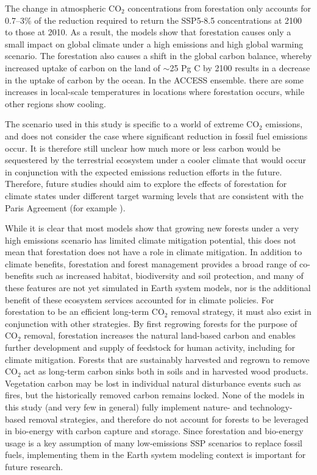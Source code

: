 \documentclass[]{article}
\begin{document}
The change in atmospheric CO$_2$ concentrations from forestation only accounts for 0.7--3\% of the reduction required to return the SSP5-8.5 concentrations at 2100 to those at 2010.
As a result, the models show that forestation causes only a small impact on global climate under a high emissions and high global warming scenario.
The forestation also causes a shift in the global carbon balance, whereby increased uptake of carbon on the land of $\sim$25 Pg C by 2100 results in a decrease in the uptake of carbon by the ocean.
In the ACCESS ensemble. there are some increases in local-scale temperatures in locations where forestation occurs, while other regions show cooling.

The scenario used in this study is specific to a world of extreme CO$_2$ emissions, and does not consider the case where significant reduction in fossil fuel emissions occur.
It is therefore still unclear how much more or less carbon would be sequestered by the terrestrial ecosystem under a cooler climate that would occur in conjunction with the expected emissions reduction efforts in the future.
Therefore, future studies should aim to explore the effects of forestation for climate states under different target warming levels that are consistent with the Paris Agreement  (for example \cite{king_studying_2021}).

While it is clear that most models show that growing new forests under a very high emissions scenario has limited climate mitigation potential, this does not mean that forestation does not have a role in climate mitigation.
In addition to climate benefits, forestation and forest management provides a broad range of co-benefits such as increased habitat, biodiversity and soil protection, and many of these features are not yet simulated in Earth system models, nor is the additional benefit of these ecosystem services accounted for in climate policies.
For forestation to be an efficient long-term CO$_2$ removal strategy, it must also exist in conjunction with other strategies.
By first regrowing forests for the purpose of CO$_2$ removal, forestation increases the natural land-based carbon and enables further development and supply of feedstock for human activity, including for climate mitigation.
Forests that are sustainably harvested and regrown to remove CO$_2$ act as long-term carbon sinks both in soils and in harvested wood products.
Vegetation carbon may be lost in individual natural disturbance events such as fires, but the historically removed carbon remains locked.
None of the models in this study (and very few in general) fully implement nature- and technology-based removal strategies, and therefore do not account for forests to be leveraged in bio-energy with carbon capture and storage.
Since forestation and bio-energy usage is a key assumption of many low-emissions SSP scenarios to replace fossil fuels, implementing them in the Earth system modeling context is important for future research.
\end{document}
